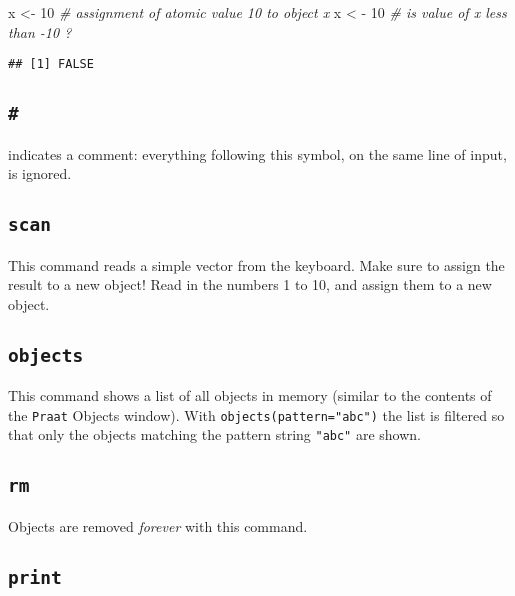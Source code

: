 \documentclass[
]{book}
\newenvironment{Shaded}{\begin{snugshade}}{\end{snugshade}}
\newcommand{\CommentTok}[1]{\textcolor[rgb]{0.56,0.35,0.01}{\textit{#1}}}
\newcommand{\DecValTok}[1]{\textcolor[rgb]{0.00,0.00,0.81}{#1}}
\newcommand{\NormalTok}[1]{#1}
\newcommand{\OtherTok}[1]{\textcolor[rgb]{0.56,0.35,0.01}{#1}}
\newcommand{\SpecialCharTok}[1]{\textcolor[rgb]{0.00,0.00,0.00}{#1}}
\begin{document}
\begin{Shaded}
\begin{Highlighting}[]
\NormalTok{x }\OtherTok{\textless{}{-}} \DecValTok{10} \CommentTok{\# assignment of atomic value 10 to object x}
\NormalTok{x }\SpecialCharTok{\textless{}} \SpecialCharTok{{-}} \DecValTok{10} \CommentTok{\# is value of x less than {-}10 ?}
\end{Highlighting}
\end{Shaded}

\begin{verbatim}
## [1] FALSE
\end{verbatim}

\hypertarget{section-1}{%
\subsection{\texorpdfstring{\texttt{\#}}{\#}}\label{section-1}}

indicates a comment: everything following this symbol, on the same
line of input, is ignored.

\hypertarget{scan}{%
\subsection{\texorpdfstring{\texttt{scan}}{scan}}\label{scan}}

This command reads a simple vector from the keyboard. Make sure to
assign the result to a new object! Read in the numbers 1 to 10, and
assign them to a new object.

\hypertarget{objects}{%
\subsection{\texorpdfstring{\texttt{objects}}{objects}}\label{objects}}

This command shows a list of all objects in memory (similar to the
contents of the \texttt{Praat} Objects window). With \texttt{objects(pattern="abc")} the list is filtered so that only the objects matching the pattern string \texttt{"abc"} are shown.

\hypertarget{rm}{%
\subsection{\texorpdfstring{\texttt{rm}}{rm}}\label{rm}}

Objects are removed \emph{forever} with this command.

\hypertarget{print}{%
\subsection{\texorpdfstring{\texttt{print}}{print}}\label{print}}
\end{document}
